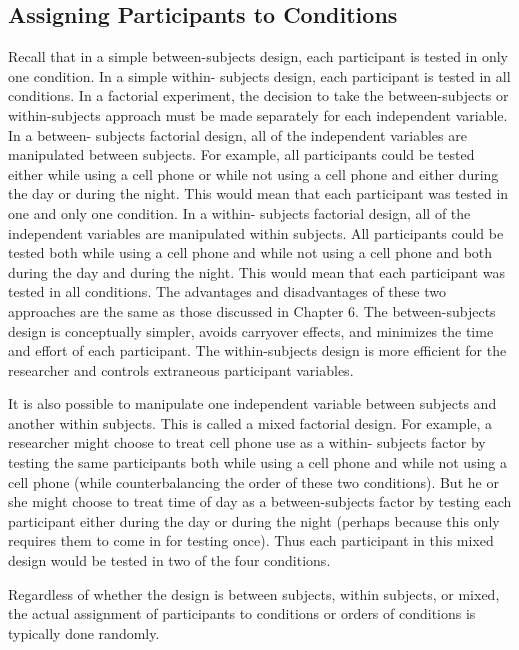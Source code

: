 \subsection{Assigning Participants to Conditions}

Recall that in a simple between-subjects design, each participant is tested in only one condition. In a simple within- subjects design, each participant is tested in all conditions. In a factorial experiment, the decision to take the between-subjects or within-subjects approach must be made separately for each independent variable. In a between- subjects factorial design, all of the independent variables are manipulated between subjects. For example, all participants could be tested either while using a cell phone or while not using a cell phone and either during the day or during the night. This would mean that each participant was tested in one and only one condition. In a within- subjects factorial design, all of the independent variables are manipulated within subjects. All participants could be tested both while using a cell phone and while not using a cell phone and both during the day and during the night. This would mean that each participant was tested in all conditions. The advantages and disadvantages of these two approaches are the same as those discussed in Chapter 6. The between-subjects design is conceptually simpler, avoids carryover effects, and minimizes the time and effort of each participant. The within-subjects design is more efficient for the researcher and controls extraneous participant variables.


It is also possible to manipulate one independent variable between subjects and another within subjects. This is called a mixed factorial design. For example, a researcher might choose to treat cell phone use as a within- subjects factor by testing the same participants both while using a cell phone and while not using a cell phone (while counterbalancing the order of these two conditions). But he or she might choose to treat time of day as a between-subjects factor by testing each participant either during the day or during the night (perhaps because this only requires them to come in for testing once). Thus each participant in this mixed design would be tested in two of the four conditions.

Regardless of whether the design is between subjects, within subjects, or mixed, the actual assignment of participants to conditions or orders of conditions is typically done randomly.

